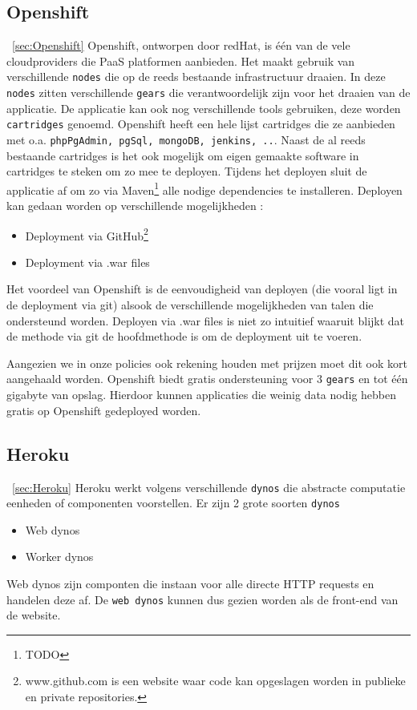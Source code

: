 \subsection{Openshift}~\ref{sec:Openshift}
Openshift, ontworpen door redHat, is één van de vele cloudproviders die PaaS platformen aanbieden.
Het maakt gebruik van verschillende \texttt{nodes} die op de reeds bestaande infrastructuur draaien.
In deze \texttt{nodes} zitten verschillende \texttt{gears} die verantwoordelijk zijn voor het draaien van de applicatie.
De applicatie kan ook nog verschillende tools gebruiken, deze worden \texttt{cartridges} genoemd.
Openshift heeft een hele lijst cartridges die ze aanbieden met o.a. \texttt{phpPgAdmin, pgSql, mongoDB, jenkins, ..}.
Naast de al reeds bestaande cartridges is het ook mogelijk om eigen gemaakte software in cartridges te steken om zo mee te deployen.
Tijdens het deployen sluit de applicatie af om zo via Maven\footnote{TODO} alle nodige dependencies te installeren.
Deployen kan gedaan worden op verschillende mogelijkheden :
\begin{itemize}
	\item Deployment via GitHub\footnote{www.github.com is een website waar code kan opgeslagen worden in publieke en private repositories.}
	\item Deployment via .war files
\end{itemize}
Het voordeel van Openshift is de eenvoudigheid van deployen (die vooral ligt in de deployment via git) alsook de verschillende mogelijkheden van talen die ondersteund worden.
Deployen via .war files is niet zo intuitief waaruit blijkt dat de methode via git de hoofdmethode is om de deployment uit te voeren.

Aangezien we in onze policies ook rekening houden met prijzen moet dit ook kort aangehaald worden.
Openshift biedt gratis ondersteuning voor 3 \texttt{gears} en tot één gigabyte van opslag.
Hierdoor kunnen applicaties die weinig data nodig hebben gratis op Openshift gedeployed worden.

\subsection{Heroku}~\ref{sec:Heroku}
Heroku werkt volgens verschillende \texttt{dynos} die abstracte computatie eenheden of componenten voorstellen.
Er zijn 2 grote soorten \texttt{dynos}
\begin{itemize}
	\item Web dynos
	\item Worker dynos
\end{itemize}
Web dynos zijn componten die instaan voor alle directe HTTP requests en handelen deze af.
De \texttt{web dynos} kunnen dus gezien worden als de front-end van de website.

